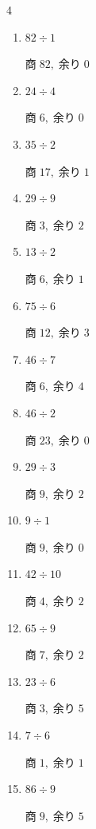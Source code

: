\begin{multicols}{4}
\begin{enumerate}
\columnbreak %

  \item $82 \div 1$

        $商\; 82,\; 余り\; 0$

  \item $24 \div 4$

        $商\; 6,\; 余り\; 0$

  \item $35 \div 2$

        $商\; 17,\; 余り\; 1$

  \item $29 \div 9$

        $商\; 3,\; 余り\; 2$

  \item $13 \div 2$

        $商\; 6,\; 余り\; 1$

  \item $75 \div 6$

        $商\; 12,\; 余り\; 3$

  \item $46 \div 7$

        $商\; 6,\; 余り\; 4$

  \item $46 \div 2$

        $商\; 23,\; 余り\; 0$

  \item $29 \div 3$

        $商\; 9,\; 余り\; 2$

  \item $9 \div 1$

        $商\; 9,\; 余り\; 0$

  \item $42 \div 10$

        $商\; 4,\; 余り\; 2$

  \item $65 \div 9$

        $商\; 7,\; 余り\; 2$

  \item $23 \div 6$

        $商\; 3,\; 余り\; 5$

  \item $7 \div 6$

        $商\; 1,\; 余り\; 1$

  \item $86 \div 9$

        $商\; 9,\; 余り\; 5$


\end{enumerate}
\end{multicols}
